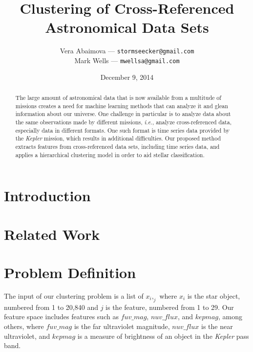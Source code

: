 \documentclass[12pt]{article}
\title{
	Clustering of Cross-Referenced Astronomical Data Sets
}
\author{
	Vera Abaimova --- \texttt{stormseecker@gmail.com} \\ 
        Mark Wells --- \texttt{mwellsa@gmail.com}
}
\date{December 9, 2014}
\begin{document}
\maketitle

\begin{abstract}
The large amount of astronomical data that is now available from a multitude of missions creates a need for machine learning methods that can analyze it and glean information about our universe.
One challenge in particular is to analyze data about the same observations made by different missions, \textit{i.e.}, analyze cross-referenced data, especially data in different formats.
One such format is time series data provided by the \textit{Kepler} mission, which results in additional difficulties.
Our proposed method extracts features from cross-referenced data sets, including time series data, and applies a hierarchical clustering model in order to aid stellar classification.

\end{abstract}

\section{Introduction} %
\label{sec:Introduction}


\section{Related Work} %
\label{sec:Related Work}


\section{Problem Definition} %
\label{sec:Problem Definition}


The input of our clustering problem is a list of $x_i,_j$ where $x_i$ is the star object, numbered from 1 to 20,840 and $j$ is the feature, numbered from 1 to 29.
Our feature space includes features such as $fuv\_mag$, $nuv\_flux$, and $kepmag$, among others, where $fuv\_mag$ is the far ultraviolet magnitude, $nuv\_flux$ is the near ultraviolet, and $kepmag$ is a measure of brightness of an object in the \textit{Kepler} pass band.
\end{document}
